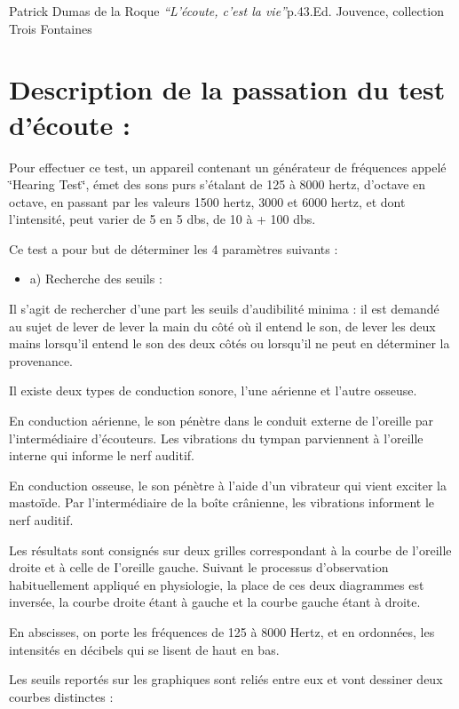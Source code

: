 \documentclass[12pt,french]{report}
\makeatletter
\let\SF@@footnote\footnote
\def\footnote{\ifx\protect\@typeset@protect
    \expandafter\SF@@footnote
  \else
    \expandafter\SF@gobble@opt
  \fi
}
\edef\SF@gobble@opt{\noexpand\protect
  \expandafter\noexpand\csname SF@gobble@opt \endcsname}
\makeatother
\begin{document}
\footnote{Patrick Dumas de la Roque \emph{``L'écoute, c'est la vie''}p.43.Ed.
Jouvence, collection Trois Fontaines}

\section{Description de la passation du test d'écoute :}

Pour effectuer ce test, un appareil contenant un générateur de fréquences
appelé \char`\"{}Hearing Test\char`\"{}, émet des sons purs s'étalant
de 125 à 8000 hertz, d'octave en octave, en passant par les valeurs
1500 hertz, 3000 et 6000 hertz, et dont l'intensité, peut varier de
5 en 5 dbs, de 10 à + 100 dbs. 

Ce test a pour but de déterminer les 4 paramètres suivants : 
\begin{itemize}
\item a) Recherche des seuils :
\end{itemize}
Il s'agit de rechercher d'une part les seuils d\textquoteright audibilité
minima : il est demandé au sujet de lever de lever la main du côté
où il entend le son, de lever les deux mains lorsqu'il entend le son
des deux côtés ou lorsqu'il ne peut en déterminer la provenance.

Il existe deux types de conduction sonore, l'une aérienne et l'autre
osseuse.

En conduction aérienne, le son pénètre dans le conduit externe de
l'oreille par l'intermédiaire d'écouteurs. Les vibrations du tympan
parviennent à l'oreille interne qui informe le nerf auditif.

En conduction osseuse, le son pénètre à l\textquoteright aide d'un
vibrateur qui vient exciter la mastoïde. Par l'intermédiaire de la
boîte crânienne, les vibrations informent le nerf auditif.

Les résultats sont consignés sur deux grilles correspondant à la courbe
de l'oreille droite et à celle de I\textquoteright oreille gauche.
\footnote{Suivant le processus d'observation habituellement appliqué en physiologie,
la place de ces deux diagrammes est inversée, la courbe droite étant
à gauche et la courbe gauche étant à droite. }

En abscisses, on porte les fréquences de 125 à 8000 Hertz, et en ordonnées,
les intensités en décibels qui se lisent de haut en bas. 

Les seuils reportés sur les graphiques sont reliés entre eux et vont
dessiner deux courbes distinctes : 
\end{document}
